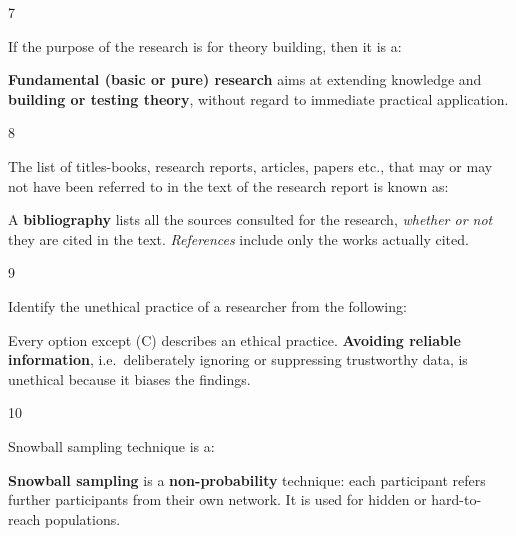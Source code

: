 \begin{question}{7}
{If the purpose of the research is for theory building, then it is a:\par}
\begin{explain}
\textbf{Fundamental (basic or pure) research} aims at extending knowledge and \textbf{building or testing theory}, without regard to immediate practical application.
\end{explain}
\end{question}

\begin{question}{8}
{The list of titles-books, research reports, articles, papers etc., that may or may not have been referred to in the text of the research report is known as:\par}
\begin{explain}
A \textbf{bibliography} lists all the sources consulted for the research, \emph{whether or not} they are cited in the text. \emph{References} include only the works actually cited.
\end{explain}
\end{question}

\begin{question}{9}
{Identify the unethical practice of a researcher from the following:\par}
\begin{explain}
Every option except (C) describes an ethical practice. \textbf{Avoiding reliable information}, i.e.\ deliberately ignoring or suppressing trustworthy data, is unethical because it biases the findings.
\end{explain}
\end{question}

\begin{question}{10}
{Snowball sampling technique is a:\par}
\begin{explain}
\textbf{Snowball sampling} is a \textbf{non-probability} technique: each participant refers further participants from their own network. It is used for hidden or hard-to-reach populations.
\end{explain}
\end{question}

